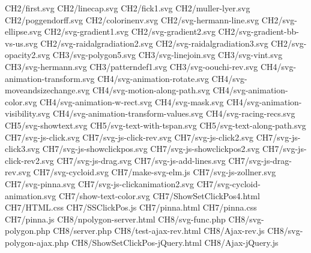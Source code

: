 CH2/first.svg
CH2/linecap.svg
CH2/fick1.svg
CH2/muller-lyer.svg
CH2/poggendorff.svg
CH2/colorinenv.svg
CH2/svg-hermann-line.svg
CH2/svg-ellipse.svg
CH2/svg-gradient1.svg
CH2/svg-gradient2.svg
CH2/svg-gradient-bb-vs-us.svg
CH2/svg-raidalgradiation2.svg
CH2/svg-raidalgradiation3.svg
CH2/svg-opacity2.svg
CH3/svg-polygon5.svg
CH3/svg-linejoin.svg
CH3/svg-vint.svg
CH3/svg-hermann.svg
CH3/patterndef1.svg
CH3/svg-oouchi-rev.svg
CH4/svg-animation-transform.svg
CH4/svg-animation-rotate.svg
CH4/svg-moveandsizechange.svg
CH4/svg-motion-along-path.svg
CH4/svg-animation-color.svg
CH4/svg-animation-w-rect.svg
CH4/svg-mask.svg
CH4/svg-animation-visibility.svg
CH4/svg-animation-transform-values.svg
CH4/svg-racing-recs.svg
CH5/svg-showtext.svg
CH5/svg-text-with-tspan.svg
CH5/svg-text-along-path.svg
CH7/svg-js-click.svg
CH7/svg-js-click-rev.svg
CH7/svg-js-click2.svg
CH7/svg-js-click3.svg
CH7/svg-js-showclickpos.svg
CH7/svg-js-showclickpos2.svg
CH7/svg-js-click-rev2.svg
CH7/svg-js-drag.svg
CH7/svg-js-add-lines.svg
CH7/svg-js-drag-rev.svg
CH7/svg-cycloid.svg
CH7/make-svg-elm.js
CH7/svg-js-zollner.svg
CH7/svg-pinna.svg
CH7/svg-js-clickanimation2.svg
CH7/svg-cycloid-animation.svg
CH7/show-text-color.svg
CH7/ShowSetClickPos4.html
CH7/HTML.css
CH7/SSClickPos.js
CH7/pinna.html
CH7/pinna.css
CH7/pinna.js
CH8/npolygon-server.html
CH8/svg-func.php
CH8/svg-polygon.php
CH8/server.php
CH8/test-ajax-rev.html
CH8/Ajax-rev.js
CH8/svg-polygon-ajax.php
CH8/ShowSetClickPos-jQuery.html
CH8/Ajax-jQuery.js

